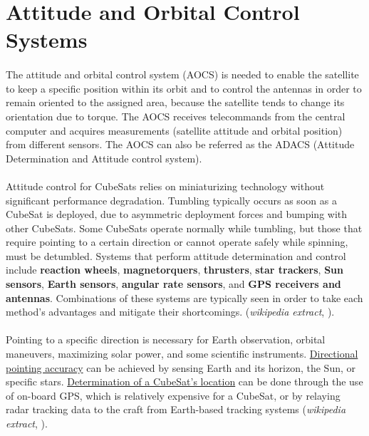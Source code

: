 \section{Attitude and Orbital Control Systems}

\paragraph{}The attitude and orbital control system (AOCS) is needed to enable the satellite to keep a specific position within its orbit and to control the antennas in order to remain oriented to the assigned area, because the satellite tends to change its orientation due to torque. The AOCS receives telecommands from the central computer and acquires measurements (satellite attitude and orbital position) from different sensors. The AOCS can also be referred as the ADACS (Attitude Determination and Attitude control system).

\paragraph{}Attitude control for CubeSats relies on miniaturizing technology without significant performance degradation. Tumbling typically occurs as soon as a CubeSat is deployed, due to asymmetric deployment forces and bumping with other CubeSats. Some CubeSats operate normally while tumbling, but those that require pointing to a certain direction or cannot operate safely while spinning, must be detumbled. Systems that perform attitude determination and control include \textbf{reaction wheels}, \textbf{magnetorquers}, \textbf{thrusters}, \textbf{star trackers}, \textbf{Sun sensors}, \textbf{Earth sensors}, \textbf{angular rate sensors}, and \textbf{GPS receivers and antennas}. Combinations of these systems are typically seen in order to take each method's advantages and mitigate their shortcomings. (\textit{wikipedia extract}, \cite{Macdonald2014}). 

\paragraph{} Pointing to a specific direction is necessary for Earth observation, orbital maneuvers, maximizing solar power, and some scientific instruments. \underline{Directional pointing accuracy} can be achieved by sensing Earth and its horizon, the Sun, or specific stars. \underline{Determination of a CubeSat's location} can be done through the use of on-board GPS, which is relatively expensive for a CubeSat, or by relaying radar tracking data to the craft from Earth-based tracking systems (\textit{wikipedia extract}, \cite{Macdonald2014}).

